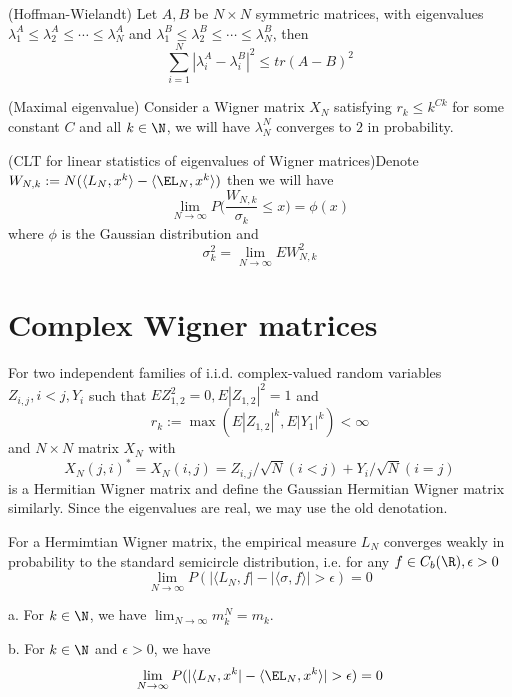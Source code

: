 \begin{lemma}
    (Hoffman-Wielandt) Let $A,B$ be $N\times N$ symmetric matrices, with eigenvalues $\lambda_1^A \leq \lambda_2^A \leq \cdots \leq \lambda_N^A$ and $\lambda_1^B \leq \lambda_2^B \leq \cdots \leq \lambda_N^B$, then
    \[\sum\limits_{i=1}^N|\lambda_i^A - \lambda_i^B|^2 \leq tr(A-B)^2\]
\end{lemma}

\begin{theorem}
    (Maximal eigenvalue) Consider a Wigner matrix $X_N$ satisfying $r_k \leq k^{Ck}$ for some constant $C$ and all $k\in\N$, we will have $\lambda_N^N$ converges to $2$ in probability.
\end{theorem}

\begin{theorem}
    (CLT for linear statistics of eigenvalues of Wigner matrices)Denote $W_{N,k} : = N(\langle L_N,x^k\rangle - \langle \EL_N,x^k\rangle)$ then we will have
    \[
    \lim_{N\to\infty}P\Big(\dfrac{W_{N,k}}{\sigma_k} \leq x\Big) = \phi(x)
    \]
    where $\phi$ is the Gaussian distribution and
    \[
    \sigma^2_k = \lim_{N\to\infty}EW_{N,k}^2
    \]
\end{theorem}

\section{Complex Wigner matrices}

\begin{definition}
    For two independent families of i.i.d. complex-valued random variables $Z_{i,j}, i<j, Y_i$ such that $EZ_{1,2}^2 = 0, E|Z_{1,2}|^2 = 1$ and
    \[r_k := \max(E|Z_{1,2}|^k,E|Y_1|^k) < \infty\]
    and $N\times N$ matrix $X_N$ with
    \[X_N(j,i)^* = X_N(i,j) = Z_{i,j}/\sqrt{N}(i<j) + Y_i/\sqrt{N}(i=j)\]
    is a Hermitian Wigner matrix and define the Gaussian Hermitian Wigner matrix similarly. Since the eigenvalues are real, we may use the old denotation.
\end{definition}

\begin{theorem}
    For a Hermimtian Wigner matrix, the empirical measure $L_N$ converges weakly in probability to the standard semicircle distribution, i.e. for any $f\in C_b(\R),\epsilon > 0$
    \[
    \lim_{N\to\infty}P(|\langle L_N,f|-|\langle \sigma,f\rangle| > \epsilon) = 0
    \]
\end{theorem}

\begin{lemma}
    a. For $k\in \N$, we have $\lim_{N\to\infty} m_k^N = m_k$.\par
    b. For $k\in \N$ and $\epsilon > 0$, we have
    \[\lim_{N\to\infty} P(|\langle L_N, x^k| - \langle \EL_N,x^k\rangle | > \epsilon) = 0\]
\end{lemma}

